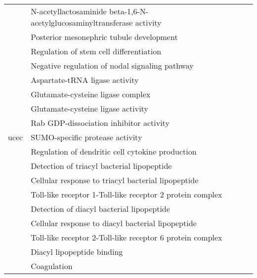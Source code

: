 \begin{appendices}
\begin{longtable}{lp{}}
									 & N-acetyllactosaminide beta-1,6-N-acetylglucosaminyltransferase activity                         \\
									 & Posterior mesonephric tubule development                                                        \\
									 & Regulation of stem cell differentiation                                                         \\
									 & Negative regulation of nodal signaling pathway                                                  \\
									 & Aspartate-tRNA ligase activity                                                                  \\
									 & Glutamate-cysteine ligase complex                                                               \\
									 & Glutamate-cysteine ligase activity                                                              \\
									 & Rab GDP-dissociation inhibitor activity                                                         \\
		\hline
		\gls{ucec}                   & SUMO-specific protease activity                                                                 \\
									 & Regulation of dendritic cell cytokine production                                                \\
									 & Detection of triacyl bacterial lipopeptide                                                      \\
									 & Cellular response to triacyl bacterial lipopeptide                                              \\
									 & Toll-like receptor 1-Toll-like receptor 2 protein complex                                       \\
									 & Detection of diacyl bacterial lipopeptide                                                       \\
									 & Cellular response to diacyl bacterial lipopeptide                                               \\
									 & Toll-like receptor 2-Toll-like receptor 6 protein complex                                       \\
									 & Diacyl lipopeptide binding                                                                      \\
									 & Coagulation                                                                                     \\

\end{longtable}
\end{appendices}
